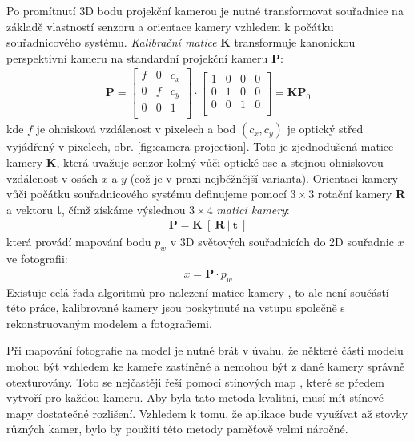 \documentclass[11pt,twoside,a4paper]{book}
\begin{document}
Po promítnutí 3D bodu projekční kamerou je nutné transformovat souřadnice na základě vlastností senzoru a orientace kamery vzhledem k počátku souřadnicového systému.  \emph{Kalibrační matice} \textbf{K} transformuje kanonickou perspektivní kameru na standardní projekční kameru \textbf{P}: 
\begin{align}
\label{eq:calibration-matrix}
\textbf{P} = 
\begin{bmatrix}
f & 0 & c_x  \\
0 & f & c_y  \\
0 & 0 & 1  \\
\end{bmatrix}
\cdot
\begin{bmatrix}
1 & 0 & 0 & 0 \\
0 & 1 & 0 & 0 \\
0 & 0 & 1 & 0 \\
\end{bmatrix}
 =\textbf{K}\textbf{P}_0
\end{align}
\noindent
kde $f$ je ohnisková vzdálenost v pixelech a bod $(c_x, c_y)$ je optický střed vyjádřený v pixelech, obr. \ref{fig:camera-projection}. Toto je zjednodušená matice kamery \textbf{K}, která uvažuje senzor kolmý vůči optické ose a stejnou ohniskovou vzdálenost v osách $x$ a $y$ (což je v praxi nejběžnější varianta). Orientaci kamery vůči počátku souřadnicového systému definujeme pomocí $3\times3$ rotační kamery \textbf{R} a vektoru \textbf{t}, čímž získáme výslednou $3\times4$ \emph{matici kamery}:
\begin{align} 
\textbf{P} = \textbf{K}~[~\textbf{R}~|~\textbf{t}~]
\end{align}
\noindent
která provádí mapování bodu $p_w$ v 3D světových souřadnicích do 2D souřadnic $x$ ve fotografii:
\begin{align}
x = \textbf{P}\cdotp p_w
\end{align}
Existuje celá řada algoritmů pro nalezení matice kamery \cite{Hartley2004}, to ale není součástí této práce, kalibrované kamery jsou poskytnuté na vstupu společně s rekonstruovaným modelem a fotografiemi.

Při mapování fotografie na model je nutné brát v úvahu, že některé části modelu mohou být vzhledem ke kameře zastíněné a nemohou být z dané kamery správně otexturovány. Toto se nejčastěji řeší pomocí stínových map \cite{Stamminger2002}, které se předem vytvoří pro každou kameru. Aby byla tato metoda kvalitní, musí mít stínové mapy dostatečné rozlišení.  Vzhledem k tomu, že aplikace bude využívat až stovky různých kamer, bylo by použití této metody paměťově velmi náročné.
\end{document}
